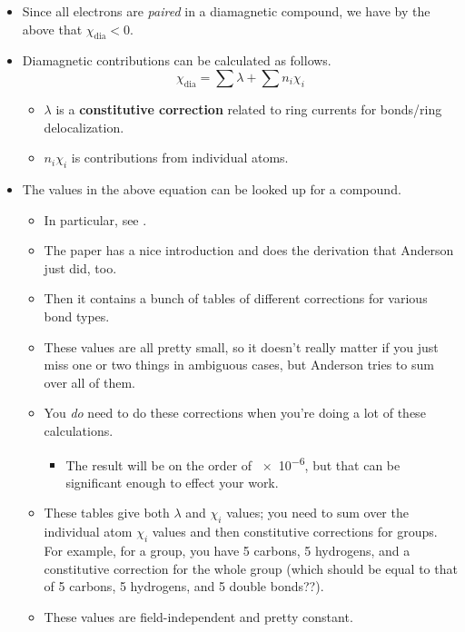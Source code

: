 \documentclass[../notes.tex]{subfiles}
\begin{document}
\begin{itemize}
    \item Since all electrons are \emph{paired} in a diamagnetic compound, we have by the above that $\chi_\text{dia}<0$.
    \item Diamagnetic contributions can be calculated as follows.
    \begin{equation*}
        \chi_\text{dia} = \sum\lambda+\sum n_i\chi_i
    \end{equation*}
    \begin{itemize}
        \item $\lambda$ is a \textbf{constitutive correction} related to ring currents for bonds/ring delocalization.
        \item $n_i\chi_i$ is contributions from individual atoms.
    \end{itemize}
    \item The values in the above equation can be looked up for a compound.
    \begin{itemize}
        \item In particular, see \textcite{bib:BerryDiamagnetism}.
        \item The paper has a nice introduction and does the derivation that Anderson just did, too.
        \item Then it contains a bunch of tables of different corrections for various bond types.
        \item These values are all pretty small, so it doesn't really matter if you just miss one or two things in ambiguous cases, but Anderson tries to sum over all of them.
        \item You \emph{do} need to do these corrections when you're doing a lot of these calculations.
        \begin{itemize}
            \item The result will be on the order of \SI{e-6}{\electromagneticunit}, but that can be significant enough to effect your work.
        \end{itemize}
        \item These tables give both $\lambda$ and $\chi_i$ values; you need to sum over the individual atom $\chi_i$ values and then constitutive corrections for groups. For example, for a  group, you have 5 carbons, 5 hydrogens, and a constitutive correction for the whole group (which should be equal to that of 5 carbons, 5 hydrogens, and 5  double bonds??).
        \item These values are field-independent and pretty constant.
    \end{itemize}

\end{itemize}
\end{document}
